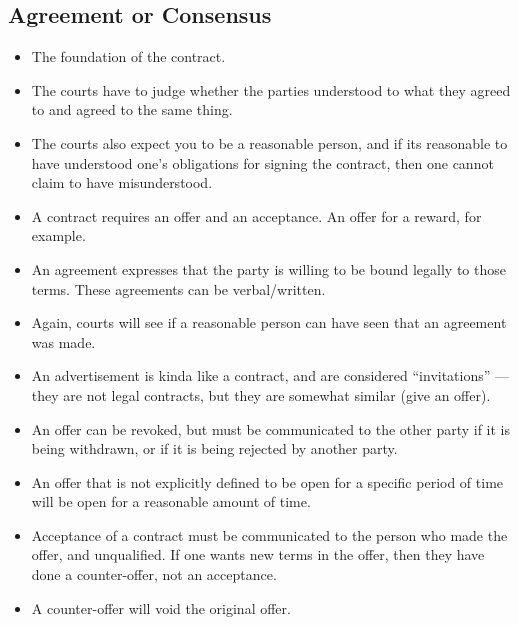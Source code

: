 \documentclass{article}
\begin{document}
\subsection{Agreement or Consensus}
\begin{itemize}
    \item The foundation of the contract.
    \item The courts have to judge whether the parties understood to what they agreed to and agreed to the same thing.
    \item The courts also expect you to be a reasonable person, and if its reasonable to have understood one's obligations for signing the contract, then one cannot claim to have misunderstood.
    \item A contract requires an offer and an acceptance.  An offer for a reward, for example.
    \item An agreement expresses that the party is willing to be bound legally to those terms.  These agreements can be verbal/written.
    \item Again, courts will see if a reasonable person can have seen that an agreement was made.
    \item An advertisement is kinda like a contract, and are considered ``invitations'' --- they are not legal contracts, but they are somewhat similar (give an offer).
    \item An offer can be revoked, but must be communicated to the other party if it is being withdrawn, or if it is being rejected by another party.
    \item An offer that is not explicitly defined to be open for a specific period of time will be open for a reasonable amount of time.
    \item Acceptance of a contract must be communicated to the person who made the offer, and unqualified.  If one wants new terms in the offer, then they have done a counter-offer, not an acceptance.
    \item A counter-offer will void the original offer.
\end{itemize}
\end{document}
